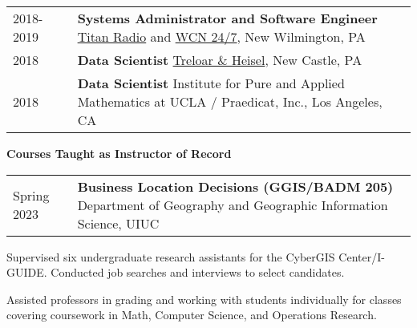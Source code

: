 \documentclass{acmcv}
\begin{document}

\begin{longtable}{p{0.16\linewidth} p{0.84\linewidth}}
    2018-2019 & \textbf{Systems Administrator and Software Engineer} \newline \href{http://titanradio.net/}{Titan Radio} and \href{https://www.wcn247.com/}{WCN 24/7}, New Wilmington, PA\\

    2018 & \textbf{Data Scientist} \newline \href{http://treloaronline.com/}{Treloar \& Heisel}, New Castle, PA\\

    2018 & \textbf{Data Scientist} \newline Institute for Pure and Applied Mathematics at UCLA / Praedicat, Inc., Los Angeles, CA\\
\end{longtable}
    

    \textbf{Courses Taught as Instructor of Record}\vspace*{-0.25cm}

    \begin{longtable}{p{0.16\linewidth} p{0.84\linewidth}}
        Spring 2023 & \textbf{Business Location Decisions (GGIS/BADM 205)} \newline Department of Geography and Geographic Information Science, UIUC \\

    \end{longtable}

    \vspace*{-0.25cm}
    \begin{titemize}
        \titem Supervised six undergraduate research assistants for the CyberGIS Center/I-GUIDE.
        \titem Conducted job searches and interviews to select candidates.
    \end{titemize}\vspace*{0.25cm}

    \vspace*{-0.25cm}
    \begin{titemize}
    	\titem Assisted professors in grading and working with students individually for classes covering coursework in Math, Computer Science, and Operations Research.
    \end{titemize}\vspace*{0.25cm}
\end{document}
